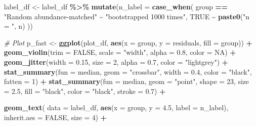 \documentclass[
]{article}
\newenvironment{Shaded}{\begin{snugshade}}{\end{snugshade}}
\newcommand{\AttributeTok}[1]{\textcolor[rgb]{0.13,0.29,0.53}{#1}}
\newcommand{\CommentTok}[1]{\textcolor[rgb]{0.56,0.35,0.01}{\textit{#1}}}
\newcommand{\ConstantTok}[1]{\textcolor[rgb]{0.56,0.35,0.01}{#1}}
\newcommand{\DecValTok}[1]{\textcolor[rgb]{0.00,0.00,0.81}{#1}}
\newcommand{\FloatTok}[1]{\textcolor[rgb]{0.00,0.00,0.81}{#1}}
\newcommand{\FunctionTok}[1]{\textcolor[rgb]{0.13,0.29,0.53}{\textbf{#1}}}
\newcommand{\NormalTok}[1]{#1}
\newcommand{\OtherTok}[1]{\textcolor[rgb]{0.56,0.35,0.01}{#1}}
\newcommand{\SpecialCharTok}[1]{\textcolor[rgb]{0.81,0.36,0.00}{\textbf{#1}}}
\newcommand{\StringTok}[1]{\textcolor[rgb]{0.31,0.60,0.02}{#1}}
\begin{document}
\begin{Shaded}
\begin{Highlighting}[]
\NormalTok{label\_df }\OtherTok{\textless{}{-}}\NormalTok{ label\_df }\SpecialCharTok{\%\textgreater{}\%}
  \FunctionTok{mutate}\NormalTok{(}\AttributeTok{n\_label =} \FunctionTok{case\_when}\NormalTok{(}
\NormalTok{    group }\SpecialCharTok{==} \StringTok{"Random abundance{-}matched"} \SpecialCharTok{\textasciitilde{}} \StringTok{"bootstrapped 1000 times"}\NormalTok{,}
    \ConstantTok{TRUE} \SpecialCharTok{\textasciitilde{}} \FunctionTok{paste0}\NormalTok{(}\StringTok{"n = "}\NormalTok{, n)}
\NormalTok{  ))}

\CommentTok{\# Plot}
\NormalTok{p\_fast }\OtherTok{\textless{}{-}} \FunctionTok{ggplot}\NormalTok{(plot\_df, }\FunctionTok{aes}\NormalTok{(}\AttributeTok{x =}\NormalTok{ group, }\AttributeTok{y =}\NormalTok{ residuals, }\AttributeTok{fill =}\NormalTok{ group)) }\SpecialCharTok{+}
  \FunctionTok{geom\_violin}\NormalTok{(}\AttributeTok{trim =} \ConstantTok{FALSE}\NormalTok{, }\AttributeTok{scale =} \StringTok{"width"}\NormalTok{, }\AttributeTok{alpha =} \FloatTok{0.8}\NormalTok{, }\AttributeTok{color =} \ConstantTok{NA}\NormalTok{) }\SpecialCharTok{+}
  \FunctionTok{geom\_jitter}\NormalTok{(}\AttributeTok{width =} \FloatTok{0.15}\NormalTok{, }\AttributeTok{size =} \DecValTok{2}\NormalTok{, }\AttributeTok{alpha =} \FloatTok{0.7}\NormalTok{, }\AttributeTok{color =} \StringTok{"lightgrey"}\NormalTok{) }\SpecialCharTok{+}
    \FunctionTok{stat\_summary}\NormalTok{(}\AttributeTok{fun =}\NormalTok{ median, }\AttributeTok{geom =} \StringTok{"crossbar"}\NormalTok{, }\AttributeTok{width =} \FloatTok{0.4}\NormalTok{, }\AttributeTok{color =} \StringTok{"black"}\NormalTok{, }\AttributeTok{fatten =} \DecValTok{1}\NormalTok{) }\SpecialCharTok{+}
  \FunctionTok{stat\_summary}\NormalTok{(}\AttributeTok{fun =}\NormalTok{ median, }\AttributeTok{geom =} \StringTok{"point"}\NormalTok{, }\AttributeTok{shape =} \DecValTok{23}\NormalTok{, }\AttributeTok{size =} \FloatTok{2.5}\NormalTok{,}
               \AttributeTok{fill =} \StringTok{"black"}\NormalTok{, }\AttributeTok{color =} \StringTok{"black"}\NormalTok{, }\AttributeTok{stroke =} \FloatTok{0.7}\NormalTok{) }\SpecialCharTok{+}

 \FunctionTok{geom\_text}\NormalTok{(}
  \AttributeTok{data =}\NormalTok{ label\_df,}
  \FunctionTok{aes}\NormalTok{(}\AttributeTok{x =}\NormalTok{ group, }\AttributeTok{y =} \FloatTok{4.5}\NormalTok{, }\AttributeTok{label =}\NormalTok{ n\_label),}
  \AttributeTok{inherit.aes =} \ConstantTok{FALSE}\NormalTok{,}
  \AttributeTok{size =} \DecValTok{4}\NormalTok{) }\SpecialCharTok{+}


\end{Highlighting}
\end{Shaded}
\end{document}
